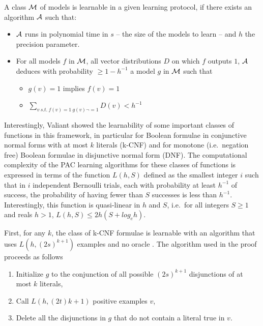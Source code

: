 \documentclass{llncs}
\begin{document}
A class $\cal M$ of models is learnable in a given learning protocol, if there exists an algorithm $\cal A$ such that:
\begin{itemize}
  \item
$\cal A$ runs in polynomial time in $s$ -- the size of the models to learn -- and $h$ the precision parameter.
  \item
For all models $f$ in $\cal M$,
all vector distributions $D$ on which $f$ outputs $1$,
$\cal A$ deduces with probability $\ge 1-h^{-1}$ a model $g$ in $\cal M$ such that
\begin{itemize}
  \item
$g(v)=1$ implies $f(v)=1$
\item
$\sum_{v\ s.t.~f(v)=1\ g(v)\neg=1} D(v) < h^{-1}$
\end{itemize}
\end{itemize}


Interestingly, Valiant showed the learnability of some important classes of functions in this framework,
in particular for Boolean formulae in conjunctive normal forms with at most $k$ literals (k-CNF)
and for monotone (i.e.~negation free) Boolean formulae in disjunctive normal form (DNF).
The computational complexity of the PAC learning algorithms for these classes of functions is expressed in terms of the function
$L(h,S)$ defined as the smallest integer $i$ such that
in $i$ independent Bernoulli trials, each with probability at least $h^{-1}$ of success, the probability of having fewer than $S$ successes is less than $h^{-1}$.
Interestingly, this function is quasi-linear in $h$ and $S$, i.e.~for all integers $S\ge 1$ and reals $h>1$, $L(h,S) \le 2h(S+log_eh)$.

First, for any $k$, the class of k-CNF formulae is learnable with an
algorithm that uses $L(h,(2s)^{k+1})$ examples and no oracle \cite{Valiant84cacm}.
The algorithm used in the proof proceeds as follows
\begin{enumerate}
  \item Initialize $g$ to the conjunction of all possible $(2s)^{k+1}$ disjunctions of at most $k$ literals,
\item Call $L(h,(2t)k+1)$ positive examples $v$,
\item Delete all the disjunctions in $g$ that do not contain a literal true in $v$.
\end{enumerate}
\end{document}
